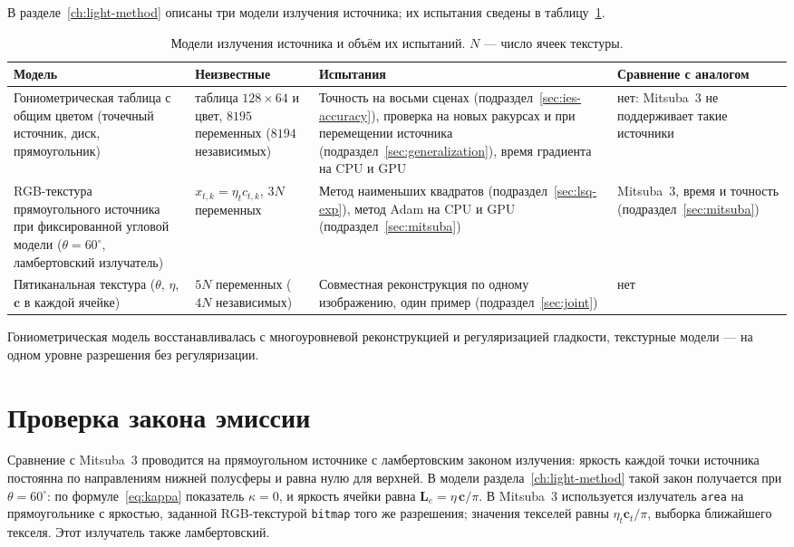 В разделе~\ref{ch:light-method} описаны три модели излучения источника; их испытания сведены в таблицу~\ref{tab:models}.

\begin{table}[htbp]
    \centering
    \small
    \renewcommand{\arraystretch}{1.15}
    \caption{Модели излучения источника и объём их испытаний. $N$ --- число ячеек текстуры.}
    \label{tab:models}
    \begin{tabularx}{\textwidth}{>{\raggedright\arraybackslash}p{} >{\raggedright\arraybackslash}p{} >{\raggedright\arraybackslash}X >{\raggedright\arraybackslash}p{}}
        \toprule
        \textbf{Модель} & \textbf{Неизвестные} & \textbf{Испытания} & \textbf{Сравнение с аналогом} \\
        \midrule
        Гониометрическая таблица с общим цветом (точечный источник, диск, прямоугольник) & таблица $128\times64$ и цвет, $8195$ переменных ($8194$ независимых) & Точность на восьми сценах (подраздел~\ref{sec:ies-accuracy}), проверка на новых ракурсах и при перемещении источника (подраздел~\ref{sec:generalization}), время градиента на CPU и GPU & нет: Mitsuba~3 не поддерживает такие источники \\
        RGB-текстура прямоугольного источника при фиксированной угловой модели ($\theta=60^\circ$, ламбертовский излучатель) & $x_{t,k}=\eta_tc_{t,k}$, $3N$ переменных & Метод наименьших квадратов (подраздел~\ref{sec:lsq-exp}), метод Adam на CPU и GPU (подраздел~\ref{sec:mitsuba}) & Mitsuba~3, время и точность (подраздел~\ref{sec:mitsuba}) \\
        Пятиканальная текстура ($\theta$, $\eta$, $\mathbf{c}$ в каждой ячейке) & $5N$ переменных ($4N$ независимых) & Совместная реконструкция по одному изображению, один пример (подраздел~\ref{sec:joint}) & нет \\
        \bottomrule
    \end{tabularx}
\end{table}

Гониометрическая модель восстанавливалась с многоуровневой реконструкцией и регуляризацией гладкости, текстурные модели --- на одном уровне разрешения без регуляризации.

\section{Проверка закона эмиссии}

Сравнение с Mitsuba~3 проводится на прямоугольном источнике с ламбертовским законом излучения: яркость каждой точки источника постоянна по направлениям нижней полусферы и равна нулю для верхней. В модели раздела~\ref{ch:light-method} такой закон получается при $\theta=60^\circ$: по формуле~\eqref{eq:kappa} показатель $\kappa=0$, и яркость ячейки равна $\mathbf{L}_e=\eta\,\mathbf{c}/\pi$. В Mitsuba~3 используется излучатель \texttt{area} на прямоугольнике с яркостью, заданной RGB-текстурой \texttt{bitmap} того же разрешения; значения текселей равны $\eta_t\mathbf{c}_t/\pi$, выборка ближайшего текселя. Этот излучатель также ламбертовский.

